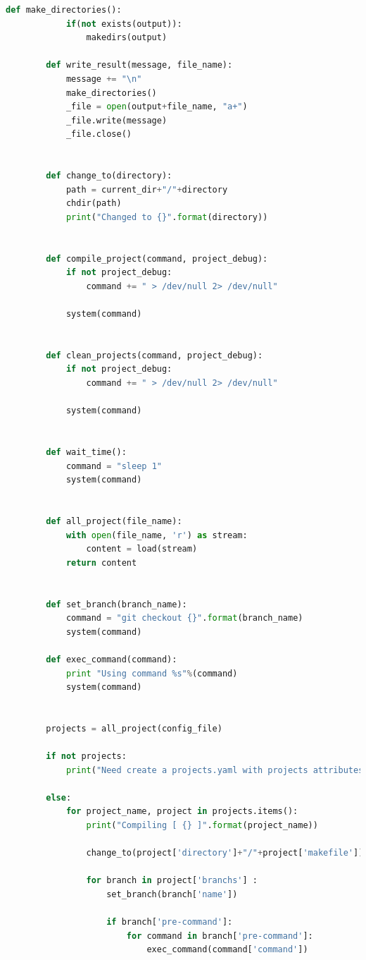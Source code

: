 \begin{apendicesenv}
\begin{lstlisting}[language=Python, caption={Script de Recompilações},
                  label=script_recompilacoes]
        def make_directories():
            if(not exists(output)):
                makedirs(output)

        def write_result(message, file_name):
            message += "\n"
            make_directories()
            _file = open(output+file_name, "a+")
            _file.write(message)
            _file.close()


        def change_to(directory):
            path = current_dir+"/"+directory
            chdir(path)
            print("Changed to {}".format(directory))


        def compile_project(command, project_debug):
            if not project_debug:
                command += " > /dev/null 2> /dev/null"

            system(command)


        def clean_projects(command, project_debug):
            if not project_debug:
                command += " > /dev/null 2> /dev/null"

            system(command)


        def wait_time():
            command = "sleep 1"
            system(command)


        def all_project(file_name):
            with open(file_name, 'r') as stream:
                content = load(stream)
            return content


        def set_branch(branch_name):
            command = "git checkout {}".format(branch_name)
            system(command)

        def exec_command(command):
            print "Using command %s"%(command)
            system(command)


        projects = all_project(config_file)

        if not projects:
            print("Need create a projects.yaml with projects attributes")

        else:
            for project_name, project in projects.items():
                print("Compiling [ {} ]".format(project_name))

                change_to(project['directory']+"/"+project['makefile'])

                for branch in project['branchs'] :
                    set_branch(branch['name'])

                    if branch['pre-command']:
                        for command in branch['pre-command']:
                            exec_command(command['command'])


\end{lstlisting}
\end{apendicesenv}
